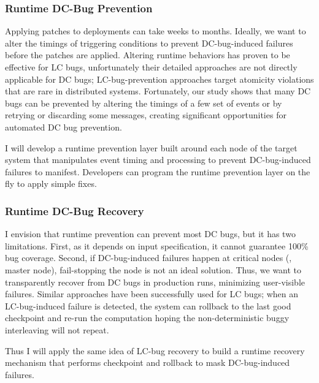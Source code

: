 \documentclass[11pt]{article}
\begin{document}
\subsubsection*{Runtime DC-Bug Prevention}

Applying patches to deployments can take weeks to months. Ideally, we want to
alter the timings of triggering conditions to prevent DC-bug-induced failures
before the patches are applied. Altering runtime behaviors has proven to be
effective for LC bugs, unfortunately their detailed approaches are not directly
applicable for DC bugs; LC-bug-prevention approaches target atomicity violations
that are rare in distributed systems. Fortunately, our study shows that many DC
bugs can be prevented by altering the timings of a few set of events or by
retrying or discarding some messages, creating significant opportunities for
automated DC bug prevention.

I will develop a runtime prevention layer built around each node of the target
system that manipulates event timing and processing to prevent DC-bug-induced
failures to manifest. Developers can program the runtime prevention layer on the
fly to apply simple fixes.

\subsubsection*{Runtime DC-Bug Recovery}

I envision that runtime prevention can prevent most DC bugs, but it has two
limitations. First, as it depends on input specification, it cannot guarantee
100\% bug coverage. Second, if DC-bug-induced failures happen at critical nodes
(\eg, master node), fail-stopping the node is not an ideal solution. Thus, we
want to transparently recover from DC bugs in production runs, minimizing
user-visible failures. Similar approaches have been successfully used for LC
bugs; when an LC-bug-induced failure is detected, the system can rollback to
the last good checkpoint and re-run the computation hoping the
non-deterministic buggy interleaving will not repeat.

Thus I will apply the same idea of LC-bug recovery to build a runtime recovery
mechanism that performs checkpoint and rollback to mask DC-bug-induced failures.

\end{document}
